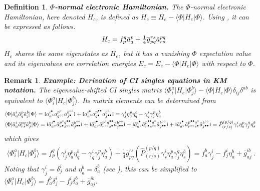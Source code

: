 \documentclass[11pt,fleqn]{article}
\newcommand{\g}{\gamma}      %
\renewcommand{\d}{\delta}    %
\newcommand{\h}{\eta}        %
\newcommand{\F}{\Phi}        %
\newcommand{\tl}{\ensuremath{\tilde}}
\newcommand{\ol}[1]{\ensuremath{\overline{#1}}}
\newcommand{\op}[1]{\ensuremath{\hat{#1}}}
\newcommand{\bmit}[1]{{\bfseries\itshape\mathversion{bold}#1}}
\newcommand{\pr}[1]{\ensuremath{\left(#1\right)}}
\newcommand{\ip}[1]{\ensuremath{\langle#1\rangle}}
\newcommand{\GNO}[1]{\setstackgap{S}{0.7pt}\ensuremath{\Shortstack{\textbf{.} \textbf{.} \textbf{.}}#1\Shortstack{\textbf{.} \textbf{.} \textbf{.}}}}
\theoremstyle{mystyle}
\newtheorem{dfn}{Definition}[section]
\newtheorem{rmk}{Remark}[section]
\numberwithin{equation}{section}
\newcommand{\hole}{\circ}
\newcommand{\ptcl}{\bullet}
\begin{document}
\begin{dfn}
\bmit{$\F$-normal electronic Hamiltonian.}
The \textit{$\F$-normal electronic Hamiltonian}, here denoted $H_c$, is defined as $H_c\equiv H_e-\ip{\F|H_e|\F}$.
Using , it can be expressed as follows.
\begin{align*}
&&
  H_c
=
  f_p^q
  \tl{a}_q^p
+
  \tfrac{1}{4}
  \ol{g}_{pq}^{rs}
  \tl{a}_{rs}^{pq}
\end{align*}
$H_c$ shares the same eigenstates as $H_e$, but it has a vanishing $\F$ expectation value and its eigenvalues are correlation energies $E_c=E_e-\ip{\F|H_e|\F}$ with respect to $\F$.
\end{dfn}

\begin{rmk}
\bmit{Example: Derivation of CI singles equations in KM notation.}
The eigenvalue-shifted CI singles matrix $\ip{\F_i^a|H_e|\F_j^b}-\ip{\F|H_e|\F}\d_{ij}\d^{ab}$ is equivalent to $\ip{\F_i^a|H_c|\F_j^b}$.
Its matrix elements can be determined from
\begin{align*}
&
  \ip{\F|\tl{a}_a^i\tl{a}_q^p\tl{a}_j^b|\F}
=
  \GNO{a_{a^\hole}^{i^\ptcl}a_{q^{\hole\hole}}^{p^\hole}a_{j^\ptcl}^{b^{\hole\hole}}}
+
  \GNO{a_{a^\hole}^{i^{\ptcl}}a_{q^{\ptcl}}^{p^{\ptcl\ptcl}}a_{j^{\ptcl\ptcl}}^{b^{\hole}}}
=
  \g^i_j\h_a^p\h_q^b
-
  \g_q^i\g_j^p\h_a^b
\\
&
  \ip{\F|\tl{a}_a^i\tl{a}_{rs}^{pq}\tl{a}_j^b|\F}
=
  \GNO{
    \tl{a}_{a^\hole}^{i^\ptcl}
    \tl{a}_{r^{\ptcl}s^{\hole\hole}}^{p^{\hole}q^{\ptcl\ptcl}}
    \tl{a}_{j^{\ptcl\ptcl}}^{b^{\hole\hole}}
  }
+
  \GNO{
    \tl{a}_{a^\hole}^{i^\ptcl}
    \tl{a}_{r^{\hole\hole}s^{\ptcl}}^{p^{\hole}q^{\ptcl\ptcl}}
    \tl{a}_{j^{\ptcl\ptcl}}^{b^{\hole\hole}}
  }
+
  \GNO{
    \tl{a}_{a^\hole}^{i^\ptcl}
    \tl{a}_{r^{\ptcl}s^{\hole\hole}}^{p^{\ptcl\ptcl}q^{\hole}}
    \tl{a}_{j^{\ptcl\ptcl}}^{b^{\hole\hole}}
  }
+
  \GNO{
    \tl{a}_{a^\hole}^{i^\ptcl}
    \tl{a}_{r^{\hole\hole}s^{\ptcl}}^{p^{\ptcl\ptcl}q^{\hole}}
    \tl{a}_{j^{\ptcl\ptcl}}^{b^{\hole\hole}}
  }
=
  \op{P}^{(p/q)}_{(r/s)}
  \g^i_r\h^p_a\g^q_j\h^b_s
\end{align*}
which gives
\begin{align*}
  \ip{\F_i^a|H_c|\F_j^b}
=
  f_p^q
  \pr{
    \g^i_j\h_a^p\h_q^b
  -
    \g_q^i\g_j^p\h_a^b
  }
+
  \tfrac{1}{4}
  \ol{g}_{pq}^{rs}
  \pr{
    \op{P}^{(p/q)}_{(r/s)}
    \g^i_r\h^p_a\g^q_j\h^b_s
  }
=
  f_a^b\g_j^i
-
  f_j^i\h_a^b
+
  \ol{g}_{aj}^{ib}\ .
\end{align*}
Noting that $\g_j^i=\d_j^i$ and $\h_a^b=\d_a^b$ (see ), this can be simplified to
$
  \ip{\F_i^a|H_c|\F_j^b}
=
  f_a^b\d_j^i
-
  f_j^i\d_a^b
+
  \ol{g}_{aj}^{ib}
$.
\end{rmk}
\end{document}

